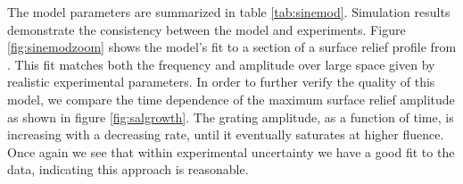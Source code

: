 \documentclass[aps, prl, twocolumn, groupedaddress]{revtex4-1}
\begin{document}
The model parameters are summarized in table
\ref{tab:sinemod}. Simulation results demonstrate the consistency
between the model and experiments. Figure \ref{fig:sinemodzoom} shows
the model's fit to a section of a surface relief profile from
\cite{saliminia}. This fit matches both the frequency and
amplitude over large space given by realistic experimental
parameters. In order to further verify the quality of this model, we
compare the time dependence of the maximum surface relief amplitude as
shown in figure \ref{fig:salgrowth}. The grating
amplitude, as a function of time, is increasing with a decreasing
rate, until it eventually saturates at higher fluence. Once again we
see that within experimental uncertainty we have a good fit to the data,
indicating this approach is reasonable.
\end{document}
